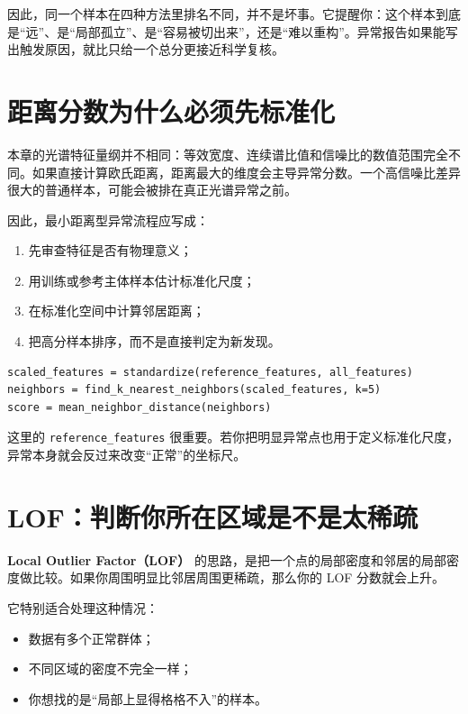 因此，同一个样本在四种方法里排名不同，并不是坏事。它提醒你：这个样本到底是“远”、是“局部孤立”、是“容易被切出来”，还是“难以重构”。异常报告如果能写出触发原因，就比只给一个总分更接近科学复核。

\section{距离分数为什么必须先标准化}

本章的光谱特征量纲并不相同：等效宽度、连续谱比值和信噪比的数值范围完全不同。如果直接计算欧氏距离，距离最大的维度会主导异常分数。一个高信噪比差异很大的普通样本，可能会被排在真正光谱异常之前。

因此，最小距离型异常流程应写成：

\begin{enumerate}
    \item 先审查特征是否有物理意义；
    \item 用训练或参考主体样本估计标准化尺度；
    \item 在标准化空间中计算邻居距离；
    \item 把高分样本排序，而不是直接判定为新发现。
\end{enumerate}

\begin{examplebox}[标准化后的距离分数骨架]
\begin{lstlisting}[style=pythonstyle]
scaled_features = standardize(reference_features, all_features)
neighbors = find_k_nearest_neighbors(scaled_features, k=5)
score = mean_neighbor_distance(neighbors)
\end{lstlisting}
\end{examplebox}

这里的 \texttt{reference\_features} 很重要。若你把明显异常点也用于定义标准化尺度，异常本身就会反过来改变“正常”的坐标尺。

\section{LOF：判断你所在区域是不是太稀疏}

\textbf{Local Outlier Factor（LOF）} 的思路，是把一个点的局部密度和邻居的局部密度做比较。如果你周围明显比邻居周围更稀疏，那么你的 LOF 分数就会上升。

它特别适合处理这种情况：

\begin{itemize}
    \item 数据有多个正常群体；
    \item 不同区域的密度不完全一样；
    \item 你想找的是“局部上显得格格不入”的样本。
\end{itemize}

